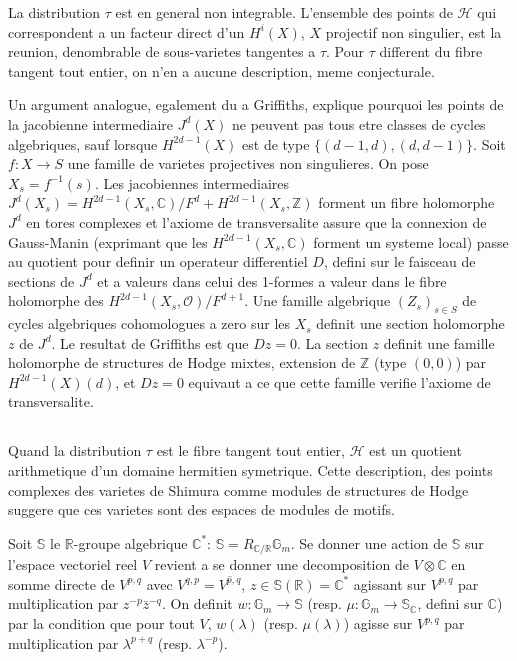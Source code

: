 \documentclass[11pt,a4paper]{article}
\theoremstyle{plain}
\theoremstyle{definition}
\newcommand{\Z}{\mathbb{Z}}
\newcommand{\C}{\mathbb{C}}
\newcommand{\R}{\mathbb{R}}
\begin{document}
La distribution $\tau$ est en general non integrable. L'ensemble des points de $\mathscr{H}$ qui correspondent a un facteur direct d'un $H^i(X)$, $X$ projectif non singulier, est la reunion, denombrable de sous-varietes tangentes a $\tau$. Pour $\tau$ different du fibre tangent tout entier, on n'en a aucune description, meme conjecturale.

Un argument analogue, egalement du a Griffiths, explique pourquoi les points de la jacobienne intermediaire $J^d(X)$ ne peuvent pas tous etre classes de cycles algebriques, sauf lorsque $H^{2d-1}(X)$ est de type $\{(d-1, d), (d, d-1)\}$. Soit $f: X \to S$ une famille de varietes projectives non singulieres. On pose $X_s = f^{-1}(s)$. Les jacobiennes intermediaires $J^d(X_s) = H^{2d-1}(X_s, \C) / F^d + H^{2d-1}(X_s, \Z)$ forment un fibre holomorphe $J^d$ en tores complexes et l'axiome de transversalite assure que la connexion de Gauss-Manin (exprimant que les $H^{2d-1}(X_s, \C)$ forment un systeme local) passe au quotient pour definir un operateur differentiel $D$, defini sur le faisceau de sections de $J^d$ et a valeurs dans celui des 1-formes a valeur dans le fibre holomorphe des $H^{2d-1}(X_s, \mathcal{O})/F^{d+1}$. Une famille algebrique $(Z_s)_{s \in S}$ de cycles algebriques cohomologues a zero sur les $X_s$ definit une section holomorphe $z$ de $J^d$. Le resultat de Griffiths est que $Dz = 0$. La section $z$ definit une famille holomorphe de structures de Hodge mixtes, extension de $\Z$ (type $(0,0)$) par $H^{2d-1}(X)(d)$, et $Dz = 0$ equivaut a ce que cette famille verifie l'axiome de transversalite.


\subsection{}

Quand la distribution $\tau$ est le fibre tangent tout entier, $\mathscr{H}$ est un quotient arithmetique d'un domaine hermitien symetrique. Cette description, des points complexes des varietes de Shimura comme modules de structures de Hodge suggere que ces varietes sont des espaces de modules de motifs.

Soit $\mathbb{S}$ le $\R$-groupe algebrique $\C^*$: $\mathbb{S} = R_{\C/\R} \mathbb{G}_m$. Se donner une action de $\mathbb{S}$ sur l'espace vectoriel reel $V$ revient a se donner une decomposition de $V \otimes \C$ en somme directe de $V^{p,q}$ avec $V^{q,p} = \overline{V^{p,q}}$, $z \in \mathbb{S}(\R) = \C^*$ agissant sur $V^{p,q}$ par multiplication par $z^{-p} \bar{z}^{-q}$. On definit $w: \mathbb{G}_m \to \mathbb{S}$ (resp. $\mu: \mathbb{G}_m \to \mathbb{S}_{\C}$, defini sur $\C$) par la condition que pour tout $V$, $w(\lambda)$ (resp. $\mu(\lambda)$) agisse sur $V^{p,q}$ par multiplication par $\lambda^{p+q}$ (resp. $\lambda^{-p}$).
\end{document}
